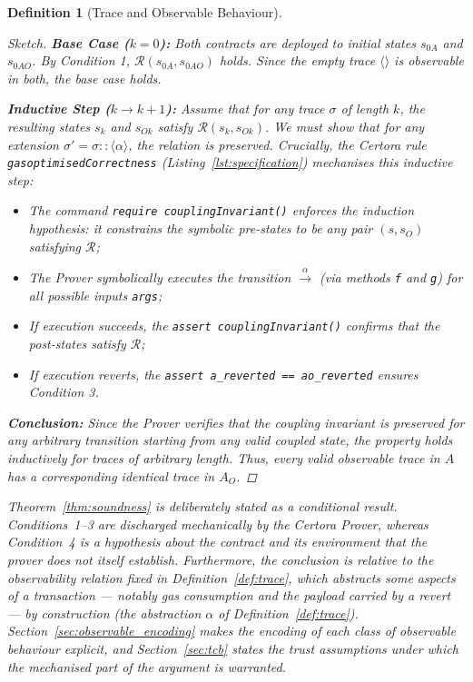 \documentclass[manuscript,screen,review]{acmart}
\newenvironment{revisedblock}{\color{red}}{}
\newtheorem{definition}{Definition}
\begin{document}
\begin{definition}[Trace and Observable Behaviour]
\begin{proof}[Sketch]
\noindent \textbf{Base Case ($k=0$):} Both contracts are deployed to initial states $s_{0A}$ and $s_{0AO}$. By Condition 1, $\mathcal{R}(s_{0A}, s_{0AO})$ holds. Since the empty trace $\langle \rangle$ is observable in both, the base case holds.

\noindent \textbf{Inductive Step ($k \to k+1$):} Assume that for any trace $\sigma$ of length $k$, the resulting states $s_k$ and $s_{Ok}$ satisfy $\mathcal{R}(s_k, s_{Ok})$. We must show that for any extension $\sigma' = \sigma :: \langle \alpha \rangle$, the relation is preserved.
Crucially, the Certora rule \texttt{gasoptimisedCorrectness} (Listing~\ref{lst:specification}) mechanises this inductive step:
\begin{itemize}
    \item The command \texttt{require couplingInvariant()} enforces the induction hypothesis: it constrains the symbolic pre-states to be any pair $(s, s_O)$ satisfying $\mathcal{R}$;
    \item The Prover symbolically executes the transition $\xrightarrow{\alpha}$ (via methods \texttt{f} and \texttt{g}) for all possible inputs \texttt{args};
    \item If execution succeeds, the \texttt{assert couplingInvariant()} confirms that the post-states satisfy $\mathcal{R}$;
    \item If execution reverts, the \texttt{assert a\_reverted == ao\_reverted} ensures Condition 3.
\end{itemize}

\noindent \textbf{Conclusion:} Since the Prover verifies that the coupling invariant is preserved for \emph{any} arbitrary transition starting from \emph{any} valid coupled state, the property holds inductively for traces of arbitrary length. Thus, every valid observable trace in $A$ has a corresponding identical trace in $A_O$.
\end{proof}

\begin{revisedblock}
Theorem~\ref{thm:soundness} is deliberately stated as a conditional result.
Conditions~1--3 are discharged mechanically by the Certora Prover, whereas
Condition~4 is a hypothesis about the contract and its environment that the
prover does not itself establish. Furthermore, the conclusion is relative to
the observability relation fixed in Definition~\ref{def:trace}, which abstracts
some aspects of a transaction --- notably gas consumption and the payload
carried by a revert --- by construction (the abstraction $\alpha$ of
Definition~\ref{def:trace}).
Section~\ref{sec:observable_encoding} makes the encoding of each class of
observable behaviour explicit, and Section~\ref{sec:tcb} states the trust
assumptions under which the mechanised part of the argument is warranted.
\end{revisedblock}


\end{definition}
\end{document}
